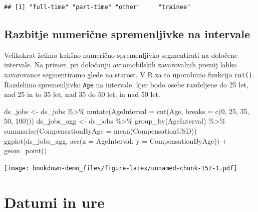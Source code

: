\documentclass[
]{book}
\newenvironment{Shaded}{\begin{snugshade}}{\end{snugshade}}
\newcommand{\AttributeTok}[1]{\textcolor[rgb]{0.77,0.63,0.00}{#1}}
\newcommand{\DecValTok}[1]{\textcolor[rgb]{0.00,0.00,0.81}{#1}}
\newcommand{\FunctionTok}[1]{\textcolor[rgb]{0.00,0.00,0.00}{#1}}
\newcommand{\NormalTok}[1]{#1}
\newcommand{\OtherTok}[1]{\textcolor[rgb]{0.56,0.35,0.01}{#1}}
\newcommand{\SpecialCharTok}[1]{\textcolor[rgb]{0.00,0.00,0.00}{#1}}
\begin{document}
\begin{verbatim}
## [1] "full-time" "part-time" "other"     "trainee"
\end{verbatim}

\hypertarget{razbitje-numeriux10dne-spremenljivke-na-intervale}{%
\subsection{Razbitje numerične spremenljivke na intervale}\label{razbitje-numeriux10dne-spremenljivke-na-intervale}}

Velikokrat želimo kakšno numerično spremenljivko segmentirati na določene intervale. Na primer, pri določanju avtomobilskih zavarovalnih premij lahko zavarovance segmentiramo glede na starost. V R za to uporabimo funkcijo \texttt{cut()}. Razdelimo spremenljivko \texttt{Age} na intervale, kjer bodo osebe razdeljene do 25 let, nad 25 in to 35 let, nad 35 do 50 let, in nad 50 let.

\begin{Shaded}
\begin{Highlighting}[]
\NormalTok{ds\_jobs }\OtherTok{\textless{}{-}}\NormalTok{ ds\_jobs }\SpecialCharTok{\%\textgreater{}\%}
  \FunctionTok{mutate}\NormalTok{(}\AttributeTok{AgeInterval =} \FunctionTok{cut}\NormalTok{(Age, }\AttributeTok{breaks =} \FunctionTok{c}\NormalTok{(}\DecValTok{0}\NormalTok{, }\DecValTok{25}\NormalTok{, }\DecValTok{35}\NormalTok{, }\DecValTok{50}\NormalTok{, }\DecValTok{100}\NormalTok{)))}
\NormalTok{ds\_jobs\_agg }\OtherTok{\textless{}{-}}\NormalTok{ ds\_jobs }\SpecialCharTok{\%\textgreater{}\%}
  \FunctionTok{group\_by}\NormalTok{(AgeInterval) }\SpecialCharTok{\%\textgreater{}\%}
  \FunctionTok{summarise}\NormalTok{(}\AttributeTok{CompensationByAge =} \FunctionTok{mean}\NormalTok{(CompensationUSD))}
\FunctionTok{ggplot}\NormalTok{(ds\_jobs\_agg, }\FunctionTok{aes}\NormalTok{(}\AttributeTok{x =}\NormalTok{ AgeInterval, }\AttributeTok{y =}\NormalTok{ CompensationByAge)) }\SpecialCharTok{+} \FunctionTok{geom\_point}\NormalTok{()}
\end{Highlighting}
\end{Shaded}

\texttt{[image: bookdown-demo\_files/figure-latex/unnamed-chunk-157-1.pdf]}

\hypertarget{datumi-in-ure}{%
\section{Datumi in ure}\label{datumi-in-ure}}
\end{document}
